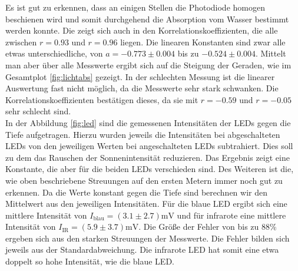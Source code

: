 \documentclass[12pt,a4paper,titlepage,headinclude,bibtotoc]{scrartcl}
\numberwithin{equation}{subsection}
\begin{document}
Es ist gut zu erkennen, dass an einigen Stellen die Photodiode homogen beschienen wird und somit durchgehend die Absorption vom Wasser bestimmt werden konnte.
Die zeigt sich auch in den Korrelationskoeffizienten, die alle zwischen $r=0.93$ und $r=0.96$ liegen.
Die linearen Konstanten sind zwar alle etwas unterschiedliche, von $a=-0.773\pm0.004$ bis zu $-0.524\pm0.004$.
Mittelt man aber über alle Messwerte ergibt sich auf die Steigung der Geraden, wie im Gesamtplot \ref{fig:lichtabs} gezeigt.
In der schlechten Messung ist die linearer Auswertung fast nicht möglich, da die Messwerte sehr stark schwanken.
Die Korrelationskoeffizienten bestätigen dieses, da sie mit $r=-0.59$ und $r=-0.05$ sehr schlecht sind.\\
In der Abbildung \ref{fig:led} sind die gemessenen Intensitäten der LEDs gegen die Tiefe aufgetragen.
Hierzu wurden jeweils die Intensitäten bei abgeschalteten LEDs von den jeweiligen Werten bei angeschalteten LEDs subtrahiert.
Dies soll zu dem das Rauschen der Sonnenintensität reduzieren.
Das Ergebnis zeigt eine Konstante, die aber für die beiden LEDs verschieden sind.
Des Weiteren ist die, wie oben beschriebene Streuungen auf den ersten Metern immer noch gut zu erkennen.
Da die Werte konstant gegen die Tiefe sind berechnen wir den Mittelwert aus den jeweiligen Intensitäten.
Für die blaue LED ergibt sich eine mittlere Intensität von $I_\text{blau}=(3.1\pm2.7)\si{\milli\volt}$ und für infrarote eine mittlere Intensität von $I_\text{IR}=(5.9\pm3.7)\si{\milli\volt}$.
Die Größe der Fehler von bis zu 88\%  ergeben sich aus den starken Streuungen der Messwerte.
Die Fehler bilden sich jeweils aus der Standardabweichung.
Die infrarote LED hat somit eine etwa doppelt so hohe Intensität, wie die blaue LED.
\end{document}
